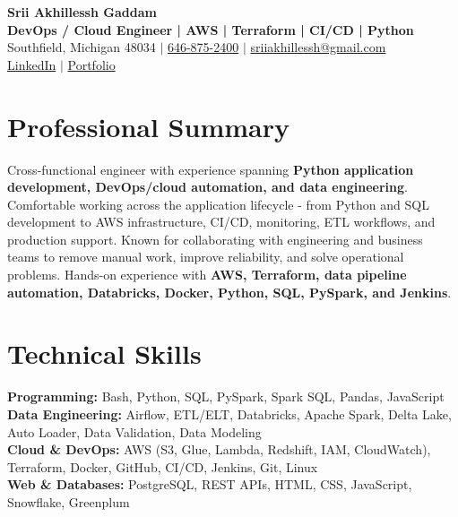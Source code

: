 \documentclass[letterpaper,10pt]{article}
\begin{document}
\fontsize{9.35pt}{10.45pt}\selectfont

\begin{center}
    {\LARGE \textbf{Srii Akhillessh Gaddam}} \\[-1pt]
    \textbf{DevOps / Cloud Engineer | AWS | Terraform | CI/CD | Python} \\[2pt]
    Southfield, Michigan 48034 $|$
    \href{tel:6468752400}{646-875-2400} $|$
    \href{mailto:sriiakhillessh@gmail.com}{sriiakhillessh@gmail.com} \\[1pt]
    \href{https://www.linkedin.com/in/srii-akhiilessh-gaddam-b48668191/}{LinkedIn} $|$
    \href{https://sriiakhillesshg.github.io/portfolio/}{Portfolio}
\end{center}
\vspace{-8pt}

\section{Professional Summary}
\small{Cross-functional engineer with experience spanning \textbf{Python application development, DevOps/cloud automation, and data engineering}. Comfortable working across the application lifecycle - from Python and SQL development to AWS infrastructure, CI/CD, monitoring, ETL workflows, and production support. Known for collaborating with engineering and business teams to remove manual work, improve reliability, and solve operational problems. Hands-on experience with \textbf{AWS, Terraform, data pipeline automation, Databricks, Docker, Python, SQL, PySpark, and Jenkins}.}

\section{Technical Skills}
\small{
\textbf{Programming:} Bash, Python, SQL, PySpark, Spark SQL, Pandas, JavaScript \\
\textbf{Data Engineering:} Airflow, ETL/ELT, Databricks, Apache Spark, Delta Lake, Auto Loader, Data Validation, Data Modeling \\
\textbf{Cloud \& DevOps:} AWS (S3, Glue, Lambda, Redshift, IAM, CloudWatch), Terraform, Docker, GitHub, CI/CD, Jenkins, Git, Linux \\
\textbf{Web \& Databases:} PostgreSQL, REST APIs, HTML, CSS, JavaScript, Snowflake, Greenplum
}
\end{document}
